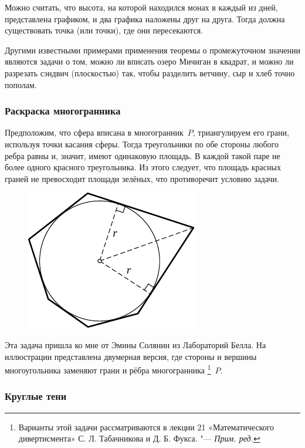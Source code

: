 \documentclass[twoside]{book}
\begin{document}
Можно считать, что высота, на которой находился монах в каждый из дней, представлена графиком, и два графика наложены друг на друга.
Тогда должна существовать точка (или точки), где они пересекаются.

Другими  известными примерами применения теоремы о промежуточном значении являются задачи о том, можно ли вписать озеро Мичиган в квадрат, и можно ли  разрезать сэндвич (плоскостью) так, чтобы разделить ветчину, сыр и хлеб точно пополам.

\subsubsection*{Раскраска многогранника}%

Предположим, что сфера вписана в многогранник~$P$, триангулируем его грани, используя точки касания сферы.
Тогда треугольники по обе стороны любого ребра равны и, значит, имеют одинаковую площадь.
В каждой такой паре не более одного красного треугольника.
Из этого следует, что площадь красных граней не превосходит площади зелёных, что противоречит условию задачи.\heart

\begin{figure}[!ht]
  \vspace{-\baselineskip}
\centering
\includegraphics{mp/wink-13}
\end{figure}

Эта задача пришла ко мне от Эмины Солянин %
из Лабораторий Белла.
На иллюстрации представлена двумерная версия, где стороны и вершины многоугольника заменяют грани и рёбра многогранника%
\footnote{Варианты этой задачи рассматриваются в лекции 21 «Математического дивертисмента» С. Л. Табачникова и Д. Б. Фукса. "--- \emph{Прим. ред.}}~$P$.

\subsubsection*{Круглые тени}%
\end{document}

